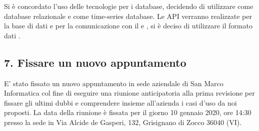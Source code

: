 	Si è concordato l'uso delle tecnologie per i database, decidendo di utilizzare  come database relazionale e  come time-series database. Le API verranno realizzate per la base di dati e per la comunicazione con il  e , si è deciso di utilizzare il formato dati .

	\subsection*{7. Fissare un nuovo appuntamento}

	E' stato fissato un nuovo appuntamento in sede aziendale di San Marco Informatica col fine di eseguire una riunione anticipatoria alla prima revisione per fissare gli ultimi dubbi e comprendere insieme all'azienda i casi d'uso da noi proposti. La data della riunione è fissata per il giorno 10 gennaio 2020, ore 14:30 presso la sede in Via Alcide de Gasperi, 132, Grisignano di Zocco 36040 (VI).